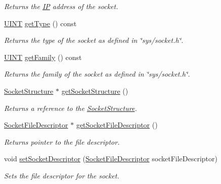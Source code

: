 \begin{DoxyCompactItemize}
\begin{DoxyCompactList}\small\item\em Returns the \hyperlink{class_communication_1_1_i_p}{I\+P} address of the socket. \end{DoxyCompactList}\item 
\hyperlink{typedefs_8h_a2e2c38961834f28c06e17e074eb00bc7}{U\+I\+N\+T} \hyperlink{class_communication_1_1base_socket_acda374c9e43cdc66573be7bb3b16db53}{get\+Type} () const 
\begin{DoxyCompactList}\small\item\em Returns the type of the socket as defined in \char`\"{}sys/socket.\+h\char`\"{}. \end{DoxyCompactList}\item 
\hyperlink{typedefs_8h_a2e2c38961834f28c06e17e074eb00bc7}{U\+I\+N\+T} \hyperlink{class_communication_1_1base_socket_ae59deca1baed0874631e5c3483eb9034}{get\+Family} () const 
\begin{DoxyCompactList}\small\item\em Returns the family of the socket as defined in \char`\"{}sys/socket.\+h\char`\"{}. \end{DoxyCompactList}\item 
\hyperlink{class_communication_1_1_socket_structure}{Socket\+Structure} $\ast$ \hyperlink{class_communication_1_1base_socket_acccdca4e8634c4bd82153904ad3d1a54}{get\+Socket\+Structure} ()
\begin{DoxyCompactList}\small\item\em Returns a reference to the \hyperlink{class_communication_1_1_socket_structure}{Socket\+Structure}. \end{DoxyCompactList}\item 
\hyperlink{class_communication_1_1_socket_file_descriptor}{Socket\+File\+Descriptor} $\ast$ \hyperlink{class_communication_1_1base_socket_a1d73b54fa8ac561a2e302440726e58d6}{get\+Socket\+File\+Descriptor} ()
\begin{DoxyCompactList}\small\item\em Returns pointer to the file descriptor. \end{DoxyCompactList}\item 
void \hyperlink{class_communication_1_1base_socket_afc8dd197527d82d6707bbfe593e62b5a}{set\+Socket\+Descriptor} (\hyperlink{class_communication_1_1_socket_file_descriptor}{Socket\+File\+Descriptor} socket\+File\+Descriptor)
\begin{DoxyCompactList}\small\item\em Sets the file descriptor for the socket. \end{DoxyCompactList}\item 

\end{DoxyCompactItemize}
